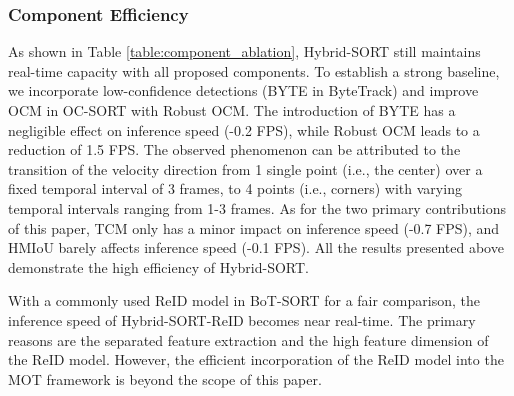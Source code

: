 \documentclass[letterpaper]{article} \usepackage{aaai23}  \usepackage{times}  \usepackage{helvet}  \usepackage{courier}  \usepackage[hyphens]{url}  \usepackage{graphicx} \urlstyle{rm} \def\UrlFont{\rm}  \usepackage{natbib}  \usepackage{caption} \frenchspacing  \setlength{\pdfpagewidth}{8.5in}  \setlength{\pdfpageheight}{11in}  \usepackage{algorithm}
\begin{document}
\subsubsection{Component Efficiency}
As shown in Table \ref{table:component_ablation}, Hybrid-SORT still maintains real-time capacity with all proposed components. To establish a strong baseline, we incorporate low-confidence detections (BYTE in ByteTrack) and improve OCM in OC-SORT with Robust OCM. The introduction of BYTE has a negligible effect on inference speed (-0.2 FPS), while Robust OCM leads to a reduction of 1.5 FPS. The observed phenomenon can be attributed to the transition of the velocity direction from 1 single point (i.e., the center) over a fixed temporal interval of 3 frames, to 4 points (i.e., corners) with varying temporal intervals ranging from 1-3 frames. As for the two primary contributions of this paper, TCM only has a minor impact on inference speed (-0.7 FPS), and HMIoU barely affects inference speed (-0.1 FPS). All the results presented above demonstrate the high efficiency of Hybrid-SORT. 

With a commonly used ReID model in BoT-SORT for a fair comparison, the inference speed of Hybrid-SORT-ReID becomes near real-time. The primary reasons are the separated feature extraction and the high feature dimension of the ReID model. However, the efficient incorporation of the ReID model into the MOT framework is beyond the scope of this paper. 
\end{document}
